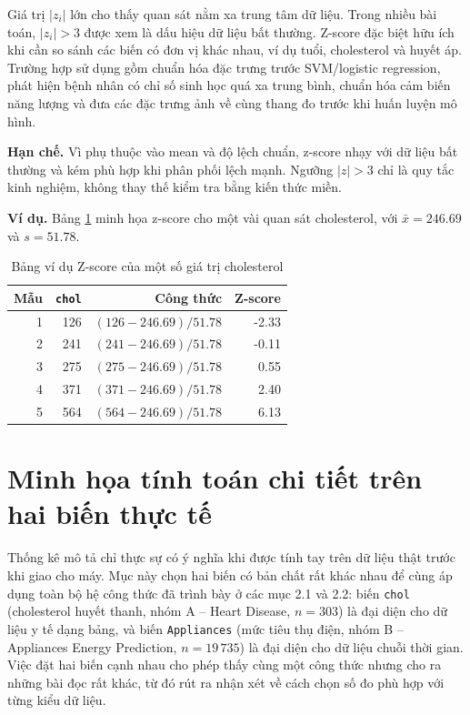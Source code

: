 Giá trị $|z_i|$ lớn cho thấy quan sát nằm xa trung tâm dữ liệu. Trong nhiều bài toán, $|z_i| > 3$ được xem là dấu hiệu dữ liệu bất thường. Z-score đặc biệt hữu ích khi cần so sánh các biến có đơn vị khác nhau, ví dụ tuổi, cholesterol và huyết áp. Trường hợp sử dụng gồm chuẩn hóa đặc trưng trước SVM/logistic regression, phát hiện bệnh nhân có chỉ số sinh học quá xa trung bình, chuẩn hóa cảm biến năng lượng và đưa các đặc trưng ảnh về cùng thang đo trước khi huấn luyện mô hình.

\textbf{Hạn chế.} Vì phụ thuộc vào mean và độ lệch chuẩn, z-score nhạy với dữ liệu bất thường và kém phù hợp khi phân phối lệch mạnh. Ngưỡng $|z|>3$ chỉ là quy tắc kinh nghiệm, không thay thế kiểm tra bằng kiến thức miền.

\textbf{Ví dụ.} Bảng \ref{tab:chapter1_zscore_example} minh họa z-score cho một vài quan sát cholesterol, với $\bar{x}=246.69$ và $s=51.78$.

\begin{table}[H]
\centering
\caption{Bảng ví dụ Z-score của một số giá trị cholesterol}
\label{tab:chapter1_zscore_example}
\small
\begin{tabular}{rrrr}
\toprule
Mẫu & \texttt{chol} & Công thức & Z-score \\
\midrule
1 & 126 & $(126-246.69)/51.78$ & -2.33 \\
2 & 241 & $(241-246.69)/51.78$ & -0.11 \\
3 & 275 & $(275-246.69)/51.78$ & 0.55 \\
4 & 371 & $(371-246.69)/51.78$ & 2.40 \\
5 & 564 & $(564-246.69)/51.78$ & 6.13 \\
\bottomrule
\end{tabular}
\end{table}

\section{Minh họa tính toán chi tiết trên hai biến thực tế}

Thống kê mô tả chỉ thực sự có ý nghĩa khi được tính tay trên dữ liệu thật trước khi giao cho máy. Mục này chọn hai biến có bản chất rất khác nhau để cùng áp dụng toàn bộ hệ công thức đã trình bày ở các mục 2.1 và 2.2: biến \texttt{chol} (cholesterol huyết thanh, nhóm A -- Heart Disease, $n=303$) là đại diện cho dữ liệu y tế dạng bảng, và biến \texttt{Appliances} (mức tiêu thụ điện, nhóm B -- Appliances Energy Prediction, $n=19\,735$) là đại diện cho dữ liệu chuỗi thời gian. Việc đặt hai biến cạnh nhau cho phép thấy cùng một công thức nhưng cho ra những bài đọc rất khác, từ đó rút ra nhận xét về cách chọn số đo phù hợp với từng kiểu dữ liệu.

